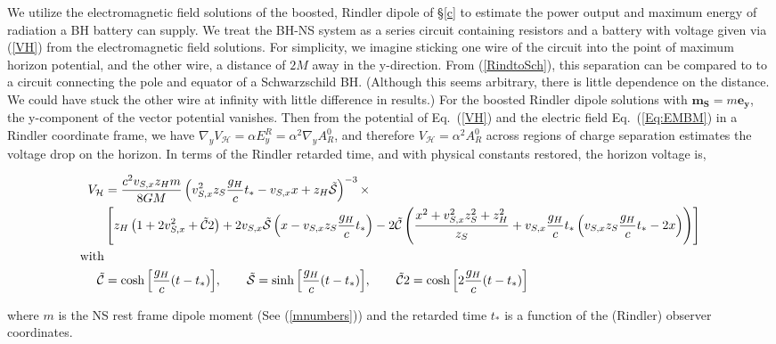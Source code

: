We utilize the electromagnetic field solutions of the boosted, Rindler
dipole of \S\ref{c} to estimate the power output and
maximum energy of radiation a BH battery can supply. 
We treat the BH-NS system as a series circuit containing
resistors and a battery with voltage given via (\ref{VH}) from the
electromagnetic field solutions. For simplicity, we imagine sticking
one wire of the circuit into the point of maximum horizon potential,
and the other wire, a distance of $2M$ away in the
y-direction. From (\ref{RindtoSch}), this separation can be compared to to a circuit connecting the pole and equator of a Schwarzschild BH. (Although this seems arbitrary, there is little dependence on the distance. We could have stuck the other wire
at infinity with little difference in results.) For
the boosted Rindler dipole solutions with $\mathbf{m_S} = m \mathbf{e_y}$, the y-component of the vector
potential vanishes. Then from the potential of Eq.\ (\ref{VH}) and
the electric field Eq.\ (\ref{Eq:EMBM}) in a Rindler coordinate frame,
we have $ \nabla_y V_{\mathcal{H}} = \alpha E^R_y =
\alpha^2 \nabla_y A^0_R $, and therefore $V_{\mathcal{H}}=\alpha^2 A_R^0$
across regions of charge separation estimates the voltage 
drop on the horizon. In terms of the Rindler retarded time, and with
physical constants restored, the horizon voltage is,
\begin{widetext}
\begin{align}
\label{BoostVolt}
V_{\mathcal{H}} &= \frac{c^2 v_{S, x} z_H m  }{8 G M}  \left(  v^2_{S, x} z_S
\frac{g_H}{c} t_* - v_{S, x} x + z_H \mathcal{\tilde{S}} \right)^{-3} \times   \\ 
& \left [    z_H \left( 1+ 2 v^2_{S, x} + \mathcal{\tilde{C}}2  \right)   + 2  v_{S, x}
  \mathcal{\tilde{S}} \left( x - v_{S, x} z_S \frac{g_H}{c}  t_* \right) - 2 \mathcal{\tilde{C}}
  \left(\frac{x^2 + v^2_{S, x} z^2_S + z^2_H}{z_S}  + v_{S, x} \frac{g_H}{c}  t_*
  \left(  v_{S, x} z_S \frac{g_H}{c}  t_* - 2 x \right)   \right)
  \right]   \nonumber \\
{\rm with } & \nonumber \\
\mathcal{\tilde{C}} &= \cosh{\left[ \frac{g_H}{c} (t - t_*)\right] }, \qquad
\mathcal{\tilde{S}} = \sinh{\left[ \frac{g_H}{c} (t - t_*)\right] }, \qquad
\mathcal{\tilde{C}}2 = \cosh{\left[ 2 \frac{g_H}{c} (t - t_*)\right] }  \nonumber
\end{align}
\end{widetext}
where $m$ is the NS rest frame dipole moment (See (\ref{mnumbers}))
and the retarded time $t_*$ is a function of the (Rindler) observer coordinates. 

